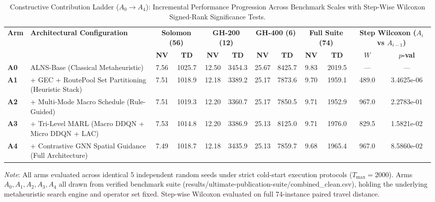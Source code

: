 \documentclass{ieeeaccess}
\begin{document}
\begin{table}[!t]
\caption{Constructive Contribution Ladder ($A_0 \to A_4$): Incremental Performance Progression Across Benchmark Scales with Step-Wise Wilcoxon Signed-Rank Significance Tests.}
\label{tab:constructive_ladder}
\centering
\scriptsize
\setlength{\tabcolsep}{1.8pt}
\begin{tabular*}{\textwidth}{@{\extracolsep{\fill}} l l cc cc cc cc cc @{}}
\toprule
\multirow{2}{*}{\textbf{Arm}} & \multirow{2}{*}{\textbf{Architectural Configuration}} & \multicolumn{2}{c}{\textbf{Solomon (56)}} & \multicolumn{2}{c}{\textbf{GH-200 (12)}} & \multicolumn{2}{c}{\textbf{GH-400 (6)}} & \multicolumn{2}{c}{\textbf{Full Suite (74)}} & \multicolumn{2}{c}{\textbf{Step Wilcoxon ($A_i$ vs $A_{i-1}$)}} \\
\cmidrule(lr){3-4} \cmidrule(lr){5-6} \cmidrule(lr){7-8} \cmidrule(lr){9-10} \cmidrule(lr){11-12}
 & & \textbf{NV} & \textbf{TD} & \textbf{NV} & \textbf{TD} & \textbf{NV} & \textbf{TD} & \textbf{NV} & \textbf{TD} & $W$ & $p$\textbf{-val} \\
\midrule
\textbf{A0} & ALNS-Base (Classical Metaheuristic) & 7.56 & 1025.7 & 12.50 & 3454.3 & 25.67 & 8425.7 & 9.83 & 2019.5 & --- & --- \\
\textbf{A1} & + GEC + RoutePool Set Partitioning (Heuristic Stack) & 7.51 & 1018.9 & 12.18 & 3389.2 & 25.17 & 7873.6 & 9.70 & 1959.1 & 489.0 & 3.4625e-06 \\
\textbf{A2} & + Multi-Mode Macro Schedule (Rule-Guided) & 7.51 & 1019.3 & 12.20 & 3360.7 & 25.17 & 7850.5 & 9.71 & 1952.9 & 967.0 & 2.2783e-01 \\
\textbf{A3} & + Tri-Level MARL (Macro DDQN + Micro DDQN + LAC) & 7.53 & 1014.8 & 12.20 & 3386.9 & 25.13 & 8125.0 & 9.71 & 1976.0 & 829.5 & 1.5821e-02 \\
\textbf{A4} & + Contrastive GNN Spatial Guidance (Full Architecture) & 7.49 & 1018.7 & 12.18 & 3435.9 & 25.13 & 7859.7 & 9.68 & 1965.4 & 967.0 & 8.5860e-02 \\
\bottomrule
\end{tabular*}
{\raggedright \footnotesize \textit{Note}: All arms evaluated across identical 5 independent random seeds under strict cold-start execution protocols ($T_{\max}=2000$). Arms $A_0, A_1, A_2, A_3, A_4$ all drawn from verified benchmark suite (\textsf{results/ultimate-publication-suite/combined\_clean.csv}), holding the underlying metaheuristic search engine and operator set fixed. Step-wise Wilcoxon evaluated on full 74-instance paired travel distance.\par}
\end{table}
\end{document}
